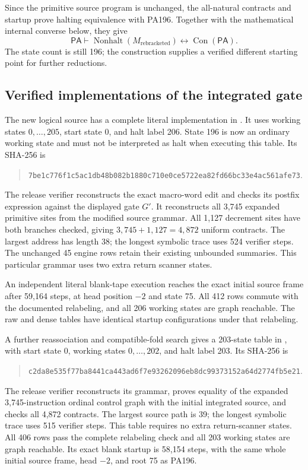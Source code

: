 \documentclass[11pt,letterpaper]{article}
\newcommand{\PA}{\mathsf{PA}}
\newcommand{\Con}{\operatorname{Con}}
\newcommand{\NH}{\operatorname{Nonhalt}}
\begin{document}
Since the primitive source program is unchanged, the all-natural contracts
and startup prove halting equivalence with PA196. Together with the
mathematical internal converse below, they give
\[
 \PA\vdash \NH(M_{\mathrm{rebracketed}})\leftrightarrow\Con(\PA).
\]
The state count is still 196; the construction supplies a verified different
starting point for further reductions.





\subsection{Verified implementations of the integrated gate}
The new logical source has a complete literal implementation in
.
It uses working states $0,\ldots,205$, start state 0, and halt label 206.
State 196 is now an ordinary working state and must not be interpreted as
halt when executing this table. Its SHA-256 is
\begin{quote}\small
\nolinkurl{7be1c776f1c5ac1db48b082b1880c710e0ce5722ea82fd66bc33e4ac561afe73}.
\end{quote}

The release verifier reconstructs the exact macro-word edit and checks its
postfix expression against the displayed gate $G'$. It reconstructs all
3,745 expanded primitive sites from the modified source grammar. All 1,127
decrement sites have both branches checked, giving $3,745+1,127=4,872$
uniform contracts. The largest address has length 38; the longest symbolic
trace uses 524 verifier steps. The unchanged 45 engine rows retain their
existing unbounded summaries. This particular grammar uses two extra return
scanner states.

An independent literal blank-tape execution reaches the exact initial
source frame after 59,164 steps, at head position $-2$ and state 75.
All 412 rows commute with the documented relabeling, and all 206 working
states are graph reachable. The raw and dense tables have identical startup
configurations under that relabeling.

A further reassociation and compatible-fold search gives a 203-state table
in , with start state 0,
working states $0,\ldots,202$, and halt label 203. Its SHA-256 is
\begin{quote}\small
\nolinkurl{c2da8e535f77ba8441ca443ad6f7e93262096eb8dc99373152a64d2774fb5e21}.
\end{quote}
The release verifier reconstructs its grammar, proves equality of the
expanded 3,745-instruction ordinal control graph with the initial integrated
source, and checks all 4,872 contracts. The largest source path is 39; the
longest symbolic trace uses 515 verifier steps. This table requires no extra
return-scanner states. All 406 rows pass the complete relabeling check and
all 203 working states are graph reachable. Its exact blank startup is
58,154 steps, with the same whole initial source frame, head $-2$, and root
75 as PA196.
\end{document}
